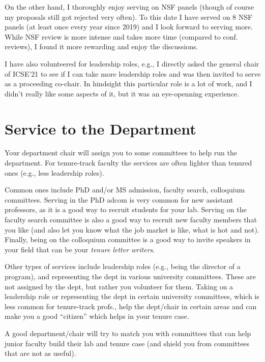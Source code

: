 \documentclass[oneside,11pt,dvipsnames]{book}
\begin{document}
On the other hand, I thoroughly enjoy serving on NSF panels (though of course my proposals still got rejected very often). To this date I have served on 8 NSF panels (at least once every year since 2019) and I look forward to serving more. While NSF review is more intense and takes more time (compared to conf. reviews), I found it more rewarding and enjoy the discussions. 


I have also volunteered for leadership roles, e.g., I directly asked the general chair of ICSE'21 to see if I can take more leadership roles and was then invited to serve as a proceeding co-chair. In hindsight this particular role is a lot of work, and I didn't really like some aspects of it, but it was an eye-openning experience. 


\section{Service to the Department}\label{sec:services-dept}
Your department chair will assign you to some committees to help run the department.  For tenure-track faculty the services are often lighter than tenured ones (e.g., less leadership roles). 

Common ones include PhD and/or MS admission, faculty search,  colloquium committees. Serving in the PhD adcom is very common for new assistant professors, as it is a good way to recruit students for your lab. Serving on the faculty search committee is also a good way to recruit new faculty members that you like (and also let you know what the job market is like, what is hot and not). Finally, being on the colloquium committee is a good way to invite speakers in your field that can be your \emph{tenure letter writers}.

Other types of services include leadership roles (e.g., being the director of a program), and representing the dept in various university committees.
These are not assigned by the dept, but rather you volunteer for them. Taking on a leadership role or representing the dept in certain university committees, which is less common for tenure-track profs., help the dept/chair in certain areas and can make you a good ``citizen'' which helps in your tenure case.

A good department/chair will try to match you with committees that can help junior faculty build their lab and tenure case (and shield you from committees that are not as useful).
\end{document}
